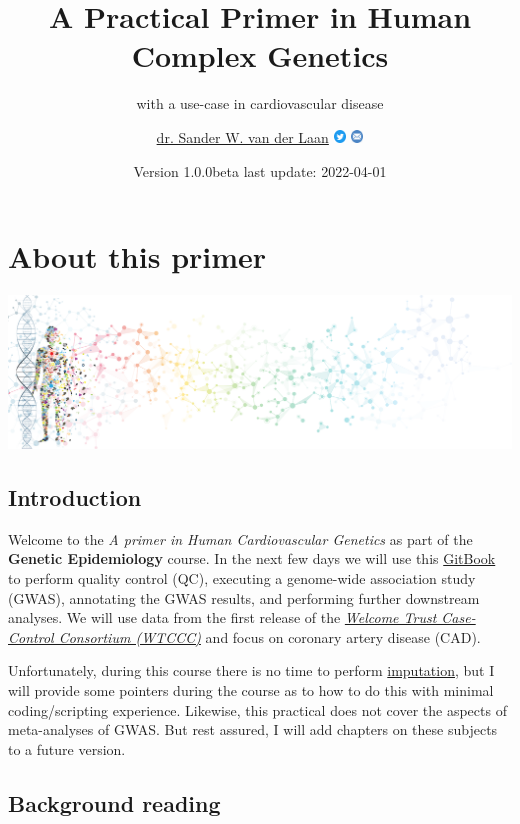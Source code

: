 \documentclass[
]{book}
\title{A Practical Primer in Human Complex Genetics}
\subtitle{with a use-case in cardiovascular disease}
\author{\href{https://swvanderlaan.github.iio}{dr. Sander W. van der Laan} \href{https://www.twitter.com/swvanderlaan}{\includegraphics[width=0.025\textwidth,height=\textheight]{img/twitter_circle_blue.png}} \href{mailto:s.w.vanderlaan@gmail.com}{\includegraphics[width=0.025\textwidth,height=\textheight]{img/email_circle_blue.png}}}
\date{Version 1.0.0beta \textbar{} last update: 2022-04-01}
\begin{document}
\maketitle

{
\setcounter{tocdepth}{1}
\tableofcontents
}
\hypertarget{about-this-primer}{%
\chapter{About this primer}\label{about-this-primer}}

\includegraphics{img/banner_man_standing_dna.png}

\hypertarget{introduction}{%
\section{Introduction}\label{introduction}}

Welcome to the \emph{A primer in Human Cardiovascular Genetics} as part of the \textbf{Genetic Epidemiology} course. In the next few days we will use this \href{https://cjvanlissa.github.io/gitbook-demo/}{GitBook} to perform quality control (QC), executing a genome-wide association study (GWAS), annotating the GWAS results, and performing further downstream analyses. We will use data from the first release of the \href{https://www.wtccc.org.uk/ccc1/overview.html}{\emph{Welcome Trust Case-Control Consortium (WTCCC)}} and focus on coronary artery disease (CAD).

Unfortunately, during this course there is no time to perform \href{https://www.nature.com/articles/nrg2796}{imputation}, but I will provide some pointers during the course as to how to do this with minimal coding/scripting experience. Likewise, this practical does not cover the aspects of meta-analyses of GWAS. But rest assured, I will add chapters on these subjects to a future version.

\hypertarget{background-reading}{%
\section{Background reading}\label{background-reading}}
\end{document}
